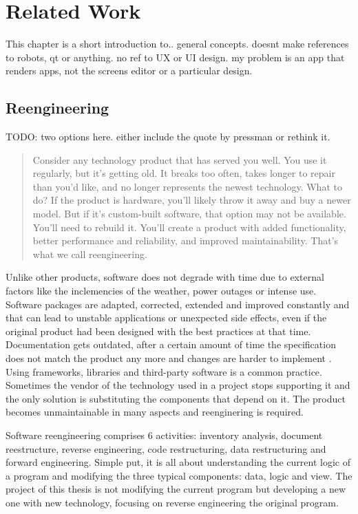 \chapter{Related Work}
This chapter is a short introduction to.. general concepts. doesnt make references to
robots, qt or anything. no ref to UX or UI design. my problem is an app that renders
apps, not the screens editor or a particular design.

\section{Reengineering}
TODO: two options here. either include the  quote by pressman or rethink it.
\begin{quote} 
Consider any technology product that has served you well. 
You use it regularly, but it's getting old. 
It breaks too often, takes longer to repair than you'd like, and no longer represents the newest technology.
What to do? If the product is hardware, you'll likely throw it away and buy a newer model.
But if it's custom-built software, that option may not be available. 
You'll need to rebuild it. 
You'll create a product with added functionality, better performance and reliability, and improved maintainability.
That's what we call reengineering. \cite{Pressman:2007}
\end{quote}

Unlike other products, software does not degrade with time due to external factors like the inclemencies of the weather, power outages or intense use.
Software packages are adapted, corrected, extended and improved constantly and that can lead to unstable applications or unexpected side effects, even if the original product had been designed with the best practices at that time.
Documentation gets outdated, after a certain amount of time the specification does not match the product any more and changes are harder to implement . %
Using frameworks, libraries and third-party software is a common practice. Sometimes the vendor of the technology used in a project stops supporting it and the only solution is substituting the components that depend on it. 
The product becomes unmaintainable in many aspects and reenginering is required. 

Software reengineering comprises 6 activities: inventory analysis, document reestructure, reverse engineering, code restructuring, data restructuring and forward engineering.
Simple put, it is all about understanding the current logic of a program and modifying the three typical components: data, logic and view.
The project of this thesis is not modifying the current program but developing a new one with new technology, focusing on reverse engineering the original program. 

